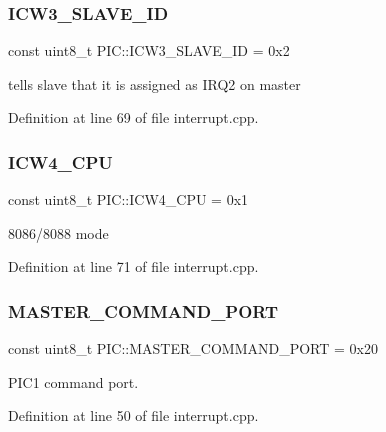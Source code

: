 \subsubsection{\texorpdfstring{I\+C\+W3\+\_\+\+S\+L\+A\+V\+E\+\_\+\+ID}{ICW3\_SLAVE\_ID}}
{\footnotesize\ttfamily const uint8\+\_\+t P\+I\+C\+::\+I\+C\+W3\+\_\+\+S\+L\+A\+V\+E\+\_\+\+ID = 0x2}



tells slave that it is assigned as I\+R\+Q2 on master 



Definition at line 69 of file interrupt.\+cpp.

\mbox{\label{namespace_p_i_c_a3d092deea6581b86dddc5fb5c7fde403}} 
\subsubsection{\texorpdfstring{I\+C\+W4\+\_\+\+C\+PU}{ICW4\_CPU}}
{\footnotesize\ttfamily const uint8\+\_\+t P\+I\+C\+::\+I\+C\+W4\+\_\+\+C\+PU = 0x1}



8086/8088 mode 



Definition at line 71 of file interrupt.\+cpp.

\mbox{\label{namespace_p_i_c_aae56765eb24eb75e1498e22c05ac29ee}} 
\subsubsection{\texorpdfstring{M\+A\+S\+T\+E\+R\+\_\+\+C\+O\+M\+M\+A\+N\+D\+\_\+\+P\+O\+RT}{MASTER\_COMMAND\_PORT}}
{\footnotesize\ttfamily const uint8\+\_\+t P\+I\+C\+::\+M\+A\+S\+T\+E\+R\+\_\+\+C\+O\+M\+M\+A\+N\+D\+\_\+\+P\+O\+RT = 0x20}



P\+I\+C1 command port. 



Definition at line 50 of file interrupt.\+cpp.

